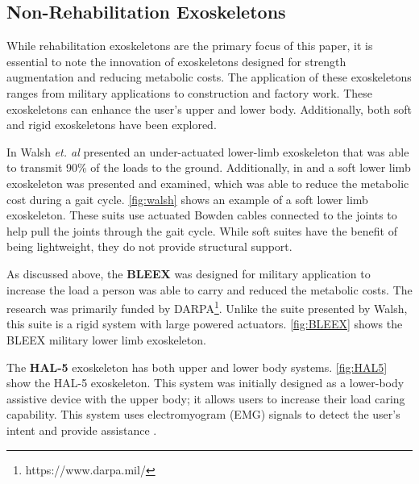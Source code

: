 \subsection{Non-Rehabilitation Exoskeletons}

While rehabilitation exoskeletons are the primary focus of this paper, it is essential to note the innovation of exoskeletons designed for strength augmentation and reducing metabolic costs. The application of these exoskeletons ranges from military applications to construction and factory work. These exoskeletons can enhance the user's upper and lower body. Additionally, both soft and rigid exoskeletons have been explored.

In \cite{walsh2006autonomous} Walsh \textit{et. al} presented an under-actuated lower-limb exoskeleton that was able to transmit 90\% of the loads to the ground. Additionally, in \cite{wehner2013lightweight} and \cite{asbeck2013biologically} a soft lower limb exoskeleton was presented and examined, which was able to reduce the metabolic cost during a gait cycle. \autoref{fig:walsh} shows an example of a soft lower limb exoskeleton. These suits use actuated Bowden cables connected to the joints to help pull the joints through the gait cycle. While soft suites have the benefit of being lightweight, they do not provide structural support.  



As discussed above, the \textbf{BLEEX} was designed for military application to increase the load a person was able to carry and reduced the metabolic costs. The research was primarily funded by DARPA\footnote{https://www.darpa.mil/}.  Unlike the suite presented by Walsh, this suite is a rigid system with large powered actuators. \autoref{fig:BLEEX} shows the BLEEX military lower limb exoskeleton.


The \textbf{HAL-5} exoskeleton has both upper and lower body systems. \autoref{fig:HAL5} show the HAL-5 exoskeleton. This system was initially designed as a lower-body assistive device with the upper body; it allows users to increase their load caring capability. This system uses electromyogram (EMG) signals to detect the user's intent and provide assistance \cite{casolo2008active}.



